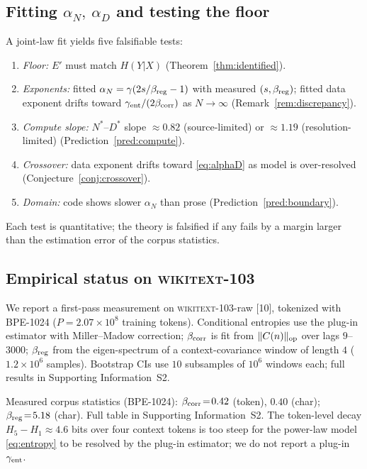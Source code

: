 \documentclass[entropy,article,submit,moreauthors,pdftex]{Definitions/mdpi}
\begin{document}
\subsection{Fitting $\alpha_N,\ \alpha_D$ and testing the floor}
A joint-law fit yields five falsifiable tests:
\begin{enumerate}[label=\textbf{(\arabic*)}]
\item \emph{Floor:} $E'$ must match $H(Y|X)$ (Theorem~\ref{thm:identified}).
\item \emph{Exponents:} fitted $\alpha_N=\gamma(2s/\beta_{\rm reg}-1)$ with
  measured $(s,\beta_{\rm reg})$; fitted data exponent drifts toward
  $\gamma_{\rm ent}/(2\beta_{\rm corr})$ as $N\!\to\!\infty$
  (Remark~\ref{rem:discrepancy}).
\item \emph{Compute slope:} $N^*$--$D^*$ slope $\approx0.82$
  (source-limited) or $\approx1.19$ (resolution-limited)
  (Prediction~\ref{pred:compute}).
\item \emph{Crossover:} data exponent drifts toward \eqref{eq:alphaD} as
  model is over-resolved (Conjecture~\ref{conj:crossover}).
\item \emph{Domain:} code shows slower $\alpha_N$ than prose
  (Prediction~\ref{pred:boundary}).
\end{enumerate}
Each test is quantitative; the theory is falsified if any fails by a
margin larger than the estimation error of the corpus statistics.

\subsection{Empirical status on \textsc{wikitext}-103}
\label{sec:empirical}

We report a first-pass measurement on \textsc{wikitext}-103-raw
[10], tokenized with BPE-1024 ($P=2.07\times10^8$ training
tokens). Conditional entropies use the plug-in estimator with Miller--Madow
correction; $\beta_{\rm corr}$ is fit from $\|C(n)\|_{\rm op}$ over lags
$9$--$3000$; $\beta_{\rm reg}$ from the eigen-spectrum of a context-covariance
window of length $4$ ($1.2\times10^6$ samples). Bootstrap CIs use $10$
subsamples of $10^6$ windows each; full results in
Supporting Information~S2.

Measured corpus statistics (BPE-1024):
$\beta_{\rm corr}\!=\!0.42$ (token), $0.40$ (char);
$\beta_{\rm reg}\!=\!5.18$ (char).  Full table in Supporting Information~S2.
The token-level decay $H_5-H_1\!\approx\!4.6$ bits over four context tokens is
too steep for the power-law model \eqref{eq:entropy} to be resolved by the
plug-in estimator; we do not report a plug-in $\gamma_{\rm ent}$.
\end{document}
